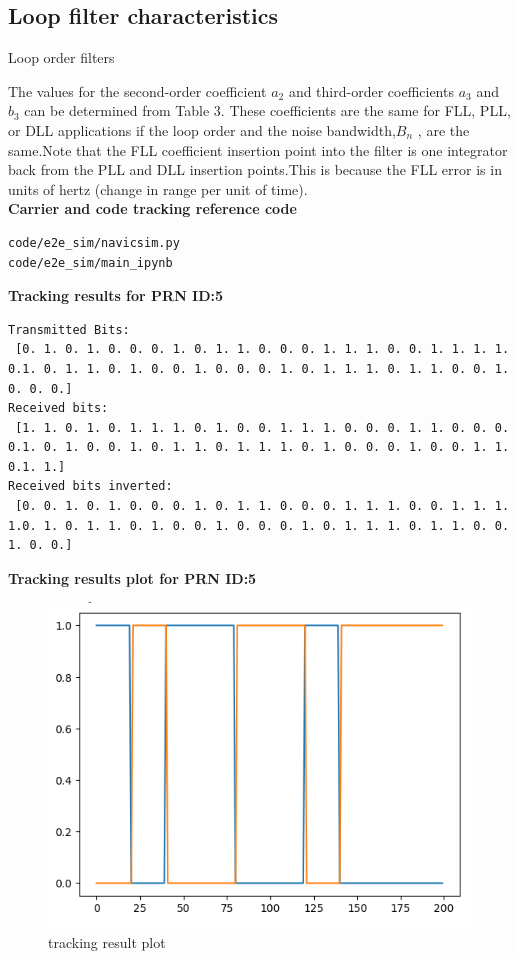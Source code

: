 \subsection{Loop filter characteristics}
\begin{table}[h]
\centering
	\caption{\Large{Loop order filters }}
	
\end{table}

The values for the second-order coefficient $a_2$ and third-order coefficients $a_3$ and $b_3$ can be determined from Table 3. These coefficients are the same for FLL, PLL, or DLL applications if the loop
order and the noise bandwidth,$B_n$ , are the same.Note that the FLL coefficient insertion point into the filter is one integrator back from the PLL and DLL insertion points.This is because the FLL error is in units of hertz (change in range per unit of time).\\
\textbf{Carrier and code tracking reference code }
\begin{lstlisting}
code/e2e_sim/navicsim.py
code/e2e_sim/main_ipynb
\end{lstlisting}
\textbf{Tracking results for PRN ID:5}
\begin{lstlisting}
Transmitted Bits:
 [0. 1. 0. 1. 0. 0. 0. 1. 0. 1. 1. 0. 0. 0. 1. 1. 1. 0. 0. 1. 1. 1. 1. 0.1. 0. 1. 1. 0. 1. 0. 0. 1. 0. 0. 0. 1. 0. 1. 1. 1. 0. 1. 1. 0. 0. 1. 0. 0. 0.]
Received bits:
 [1. 1. 0. 1. 0. 1. 1. 1. 0. 1. 0. 0. 1. 1. 1. 0. 0. 0. 1. 1. 0. 0. 0. 0.1. 0. 1. 0. 0. 1. 0. 1. 1. 0. 1. 1. 1. 0. 1. 0. 0. 0. 1. 0. 0. 1. 1. 0.1. 1.]
Received bits inverted:
 [0. 0. 1. 0. 1. 0. 0. 0. 1. 0. 1. 1. 0. 0. 0. 1. 1. 1. 0. 0. 1. 1. 1. 1.0. 1. 0. 1. 1. 0. 1. 0. 0. 1. 0. 0. 0. 1. 0. 1. 1. 1. 0. 1. 1. 0. 0. 1. 0. 0.]
\end{lstlisting}
\textbf{Tracking results plot for PRN ID:5}

\begin{figure}%
\includegraphics[width=0.5\columnwidth]{figs/tracking_plot.png}
\caption{tracking result plot}
\end{figure}



%
